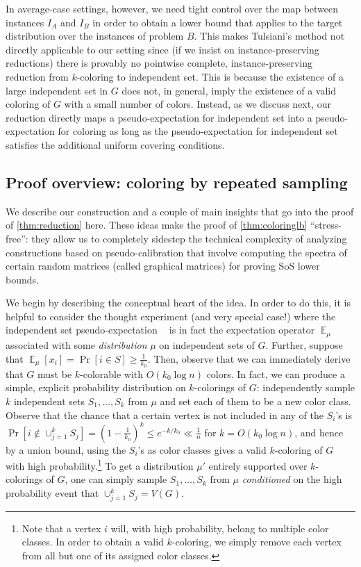 \documentclass[10pt,a4paper]{article}
\theoremstyle{definition}
\newcommand{\Esymb}{\mathbb{E}}
\newcommand{\Psymb}{\mathrm{Pr}}
\DeclareMathOperator*{\E}{\Esymb}
\DeclareMathOperator*{\ProbOp}{\Psymb}
\renewcommand{\Pr}{\ProbOp}
\DeclareMathOperator{\pE}{\tilde{\mathbb{E}}}
\newcommand{\numcolors}{k}
\newcommand{\numlb}{k_0}
\begin{document}
In average-case settings, however, we need tight control over the map between instances $I_A$ and $I_B$ in order to obtain a lower bound that applies to the target distribution over the instances of problem $B$. This makes Tulsiani's method not directly applicable to our setting since (if we insist on instance-preserving reductions) there is provably no pointwise complete, instance-preserving reduction from $k$-coloring to independent set. This is because the existence of a large independent set in $G$ does not, in general, imply the existence of a valid coloring of $G$ with a small number of colors. Instead, as we discuss next, our reduction directly maps a pseudo-expectation for independent set into a pseudo-expectation for coloring as long as the pseudo-expectation for independent set satisfies the additional uniform covering conditions.  

\subsection{Proof overview: coloring by repeated sampling} 
We describe our construction and a couple of main insights that go into the proof of \cref{thm:reduction} here. These ideas make the proof of \cref{thm:coloringlb} ``stress-free'': they allow us to completely sidestep the technical complexity of analyzing constructions based on pseudo-calibration that involve computing the spectra of certain random matrices (called graphical matrices) for proving SoS lower bounds. 

 We begin by describing the conceptual heart of the idea. In order to do this, it is helpful to consider the thought experiment (and very special case!) where the independent set pseudo-expectation $\pE$ is in fact the expectation operator  $\E_{\mu}$ associated with some \emph{distribution} $\mu$ on independent sets of $G$. Further, suppose that $\E_{\mu}[x_i] = \Pr[i \in S] \geq \frac{1}{\numlb}$. Then, observe that we can immediately derive that $G$ must be $k$-colorable with $O(\numlb \log n)$ colors. In fact, we can produce a simple, explicit probability distribution on $k$-colorings of $G$: independently sample $\numcolors$ independent sets $S_1, \dots, S_{\numcolors}$ from $\mu$ and set each of them to be a new color class. Observe that the chance that a certain vertex is not included in any of the $S_i$'s is $\Pr[i \notin \cup_{j = 1}^{\numcolors} S_j] = (1 - \frac{1}{\numlb})^{\numcolors} \leq e^{-\numcolors/\numlb} \ll \frac{1}{n}$ for $\numcolors = O(\numlb \log n)$, and hence by a union bound, using the $S_i$'s as color classes gives a valid $k$-coloring of $G$ with high probability.\footnote{Note that a vertex $i$ will, with high probability, belong to multiple color classes. In order to obtain a valid $\numcolors$-coloring, we simply remove each vertex from all but one of its assigned color classes.} To get a distribution $\mu'$ entirely supported over $\numcolors$-colorings of $G$, one can simply sample $S_1, \dots, S_{\numcolors}$ from $\mu$ \emph{conditioned} on the high probability event that $\cup_{j = 1}^{\numcolors} S_j = V(G)$. 
\end{document}
